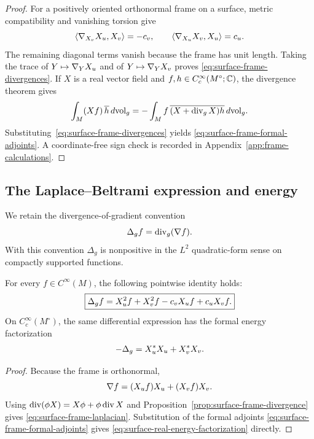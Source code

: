 \begin{proof}
For a positively oriented orthonormal frame on a surface, metric compatibility
and vanishing torsion give
\[
 \langle\nabla_{X_v}X_u,X_v\rangle=-c_v,
 \qquad
 \langle\nabla_{X_u}X_v,X_u\rangle=c_u.
\]
The remaining diagonal terms vanish because the frame has unit length.  Taking
the trace of $Y\mapsto\nabla_YX_u$ and of
$Y\mapsto\nabla_YX_v$ proves
\eqref{eq:surface-frame-divergences}.  If $X$ is a real vector field and
$f,h\in C_c^\infty(M^\circ;\mathbb{C})$, the divergence theorem gives
\[
 \int_M (Xf)\,\overline h\,d\mathrm{vol}_g
 =-\int_M f\,\overline{(X+\operatorname{div}_gX)h}\,d\mathrm{vol}_g.
\]
Substituting~\eqref{eq:surface-frame-divergences} yields
\eqref{eq:surface-frame-formal-adjoints}.  A coordinate-free sign check is
recorded in Appendix~\ref{app:frame-calculations}.
\end{proof}

\subsection{The Laplace--Beltrami expression and energy}

We retain the divergence-of-gradient convention
\begin{equation}\label{eq:surface-laplacian-convention}
 \Delta_gf=\operatorname{div}_g(\nabla f).
\end{equation}
With this convention $\Delta_g$ is nonpositive in the $L^2$ quadratic-form
sense on compactly supported functions.

\begin{proposition}
\label{prop:surface-frame-laplacian}
For every $f\in C^\infty(M)$, the following pointwise identity holds:
\begin{equation}\label{eq:surface-frame-laplacian}
 \boxed{
 \Delta_gf
 =X_u^2f+X_v^2f-c_vX_u f+c_uX_v f.
 }
\end{equation}
On $C_c^\infty(M^\circ)$, the same differential expression has the formal
energy factorization
\begin{equation}\label{eq:surface-real-energy-factorization}
 -\Delta_g=X_u^*X_u+X_v^*X_v.
\end{equation}
\end{proposition}

\begin{proof}
Because the frame is orthonormal,
\[
 \nabla f=(X_u f)X_u+(X_v f)X_v.
\]
Using
$\operatorname{div}(\phi X)=X\phi+\phi\operatorname{div} X$ and
Proposition~\ref{prop:surface-frame-divergence} gives
\eqref{eq:surface-frame-laplacian}.  Substitution of the formal adjoints
\eqref{eq:surface-frame-formal-adjoints} gives
\eqref{eq:surface-real-energy-factorization} directly.
\end{proof}

